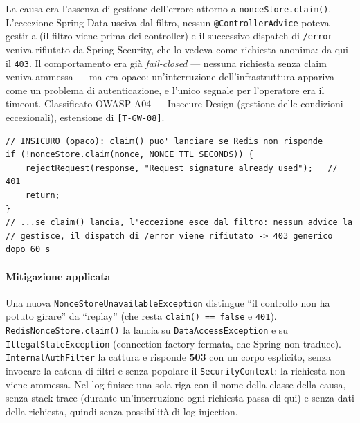 ﻿\documentclass[a4paper,12pt]{report}
\newcommand{\threat}[1]{\texttt{\small\textcolor{vulnred}{[#1]}}}
\begin{document}
La causa era l'assenza di gestione dell'errore attorno a
\texttt{nonceStore.claim()}. L'eccezione Spring Data usciva dal filtro,
nessun \texttt{@ControllerAdvice} poteva gestirla (il filtro viene prima dei
controller) e il successivo dispatch di \texttt{/error} veniva rifiutato da
Spring Security, che lo vedeva come richiesta anonima: da qui il \texttt{403}.
Il comportamento era già \emph{fail-closed} --- nessuna richiesta senza claim
veniva ammessa --- ma era opaco: un'interruzione dell'infrastruttura appariva
come un problema di autenticazione, e l'unico segnale per l'operatore era il
timeout. Classificato OWASP A04 --- Insecure Design (gestione delle condizioni
eccezionali), estensione di \threat{T-GW-08}.

\begin{insecurebox}[title={InternalAuthFilter.java --- errore dello store non gestito (baseline)}]
\begin{lstlisting}[style=java]
// INSICURO (opaco): claim() puo' lanciare se Redis non risponde
if (!nonceStore.claim(nonce, NONCE_TTL_SECONDS)) {
    rejectRequest(response, "Request signature already used");   // 401
    return;
}
// ...se claim() lancia, l'eccezione esce dal filtro: nessun advice la
// gestisce, il dispatch di /error viene rifiutato -> 403 generico dopo 60 s
\end{lstlisting}
\end{insecurebox}

\paragraph{Mitigazione applicata}
Una nuova \texttt{NonceStoreUnavailableException} distingue ``il controllo non
ha potuto girare'' da ``replay'' (che resta \texttt{claim() == false} e
\texttt{401}). \texttt{RedisNonceStore.claim()} la lancia su
\texttt{DataAccessException} e su \texttt{IllegalStateException} (connection
factory fermata, che Spring non traduce). \texttt{InternalAuthFilter} la
cattura e risponde \textbf{503} con un corpo esplicito, senza invocare la
catena di filtri e senza popolare il \texttt{SecurityContext}: la richiesta
non viene ammessa. Nel log finisce una sola riga con il nome della classe
della causa, senza stack trace (durante un'interruzione ogni richiesta passa di
qui) e senza dati della richiesta, quindi senza possibilit\`a di log injection.
\end{document}

